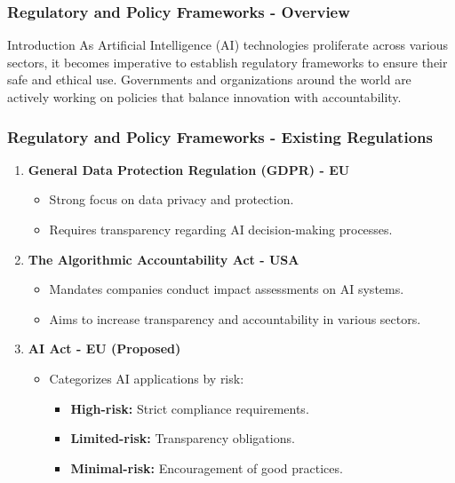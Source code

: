 \documentclass[aspectratio=169]{beamer}
\begin{document}
\begin{frame}[fragile]
    \frametitle{Regulatory and Policy Frameworks - Overview}
    \begin{block}{Introduction}
        As Artificial Intelligence (AI) technologies proliferate across various sectors, it becomes imperative to establish regulatory frameworks to ensure their safe and ethical use. Governments and organizations around the world are actively working on policies that balance innovation with accountability.
    \end{block}
\end{frame}

\begin{frame}[fragile]
    \frametitle{Regulatory and Policy Frameworks - Existing Regulations}
    \begin{enumerate}
        \item \textbf{General Data Protection Regulation (GDPR) - EU}
            \begin{itemize}
                \item Strong focus on data privacy and protection.
                \item Requires transparency regarding AI decision-making processes.
            \end{itemize}
        \item \textbf{The Algorithmic Accountability Act - USA}
            \begin{itemize}
                \item Mandates companies conduct impact assessments on AI systems.
                \item Aims to increase transparency and accountability in various sectors.
            \end{itemize}
        \item \textbf{AI Act - EU (Proposed)}
            \begin{itemize}
                \item Categorizes AI applications by risk: 
                \begin{itemize}
                    \item \textbf{High-risk:} Strict compliance requirements.
                    \item \textbf{Limited-risk:} Transparency obligations.
                    \item \textbf{Minimal-risk:} Encouragement of good practices.
                \end{itemize}
            \end{itemize}
    \end{enumerate}
\end{frame}
\end{document}
